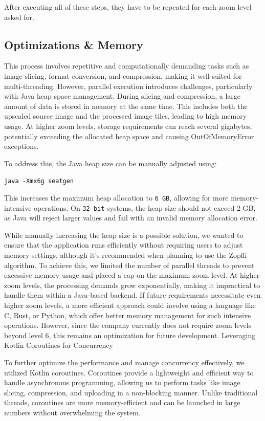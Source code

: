 After executing all of these steps, they have to be repeated for each zoom level asked for. 

\subsection{Optimizations \& Memory}

This process involves repetitive and computationally demanding tasks such as image slicing, format conversion, and compression, making it well-suited for multi-threading. However, parallel execution introduces challenges, particularly with Java heap space management. During slicing and compression, a large amount of data is stored in memory at the same time. This includes both the upscaled source image and the processed image tiles, leading to high memory usage. At higher zoom levels, storage requirements can reach several gigabytes, potentially exceeding the allocated heap space and causing OutOfMemoryError exceptions.

To address this, the Java heap size can be manually adjusted using:

\texttt{java -Xmx6g seatgen}

This increases the maximum heap allocation to \texttt{6 GB}, allowing for more memory-intensive operations. On \texttt{32-bit} systems, the heap size should not exceed 2 GB, as Java will reject larger values and fail with an invalid memory allocation error.

While manually increasing the heap size is a possible solution, we wanted to ensure that the application runs efficiently without requiring users to adjust memory settings, although it's recommended when planning to use the Zopfli algorithm. To achieve this, we limited the number of parallel threads to prevent excessive memory usage and placed a cap on the maximum zoom level. At higher zoom levels, the processing demands grow exponentially, making it impractical to handle them within a Java-based backend. If future requirements necessitate even higher zoom levels, a more efficient approach could involve using a language like C, Rust, or Python, which offer better memory management for such intensive operations. However, since the company currently does not require zoom levels beyond level 6, this remains an optimization for future development.
Leveraging Kotlin Coroutines for Concurrency

To further optimize the performance and manage concurrency effectively, we utilized Kotlin coroutines. Coroutines provide a lightweight and efficient way to handle asynchronous programming, allowing us to perform tasks like image slicing, compression, and uploading in a non-blocking manner. Unlike traditional threads, coroutines are more memory-efficient and can be launched in large numbers without overwhelming the system.


